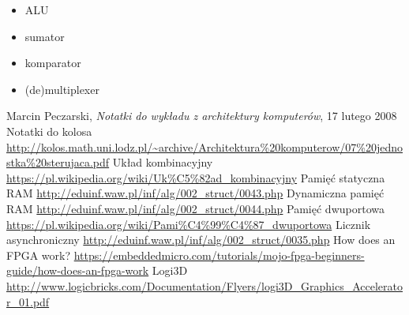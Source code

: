\begin{opracowanie}[87]










\odp

\begin{itemize}
\item ALU
\item sumator
\item komparator
\item (de)multiplexer
\end{itemize}



\end{opracowanie}

\begin{thebibliography}{99}
 Marcin Peczarski, \emph{Notatki do wykładu z architektury komputerów}, 17 lutego 2008
 Notatki do kolosa \url{http://kolos.math.uni.lodz.pl/~archive/Architektura%20komputerow/07%20jednostka%20sterujaca.pdf}
 Układ kombinacyjny \url{https://pl.wikipedia.org/wiki/Uk%C5%82ad_kombinacyjny}
 Pamięć statyczna RAM \url{http://eduinf.waw.pl/inf/alg/002_struct/0043.php}
 Dynamiczna pamięć RAM \url{http://eduinf.waw.pl/inf/alg/002_struct/0044.php}
 Pamięć dwuportowa \url{https://pl.wikipedia.org/wiki/Pami%C4%99%C4%87_dwuportowa}
 Licznik asynchroniczny \url{http://eduinf.waw.pl/inf/alg/002_struct/0035.php}
 How does an FPGA work? \url{https://embeddedmicro.com/tutorials/mojo-fpga-beginners-guide/how-does-an-fpga-work}
 Logi3D \url{http://www.logicbricks.com/Documentation/Flyers/logi3D_Graphics_Accelerator_01.pdf}
\end{thebibliography}
